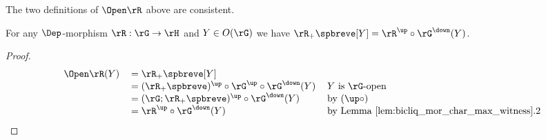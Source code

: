 \documentclass{article}
\begin{document}
\bigskip
The two definitions of $\Open\rR$ above are consistent.

\begin{lemma}
\label{lem:open_r_two_defs}
For any $\Dep$-morphism $\rR : \rG \to \rH$ and $Y \in O(\rG)$ we have $\rR_+\spbreve[Y] = \rR^\up \circ \rG^\down(Y)$.
\end{lemma}

\begin{proof}
\[
\begin{tabular}{lll}
$\Open \rR(Y)$
&
$=\rR_+\spbreve[Y]$
\\&
$= (\rR_+\spbreve)^\up \circ \rG^\up \circ \rG^\down(Y) $
& $Y$ is $\rG$-open
\\&
$= (\rG;\rR_+\spbreve)^\up \circ \rG^\down(Y) $
& by $(\up\circ)$
\\&
$=  \rR^\up \circ \rG^\down(Y)$
& by Lemma \ref{lem:bicliq_mor_char_max_witness}.2 
\end{tabular}
\]
\end{proof}
\end{document}
